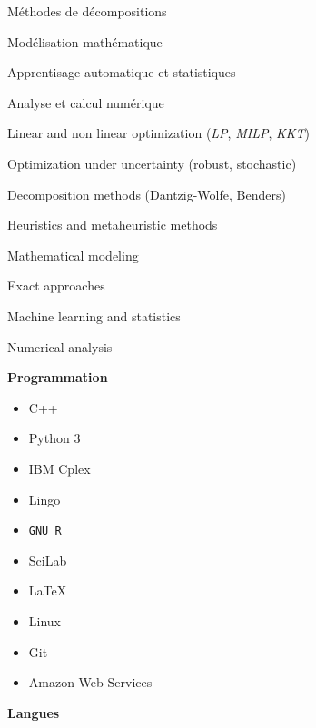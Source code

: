 \documentclass[11.5pt]{article}
\newcommand\en[1]{#1}
\begin{document}
\begin{minipage}[t]{\textwidth}
\begin{minipage}[t]{\cvRightWidth}
\begin{itemize}
{                        \item Méthodes de décompositions
                        \item Modélisation mathématique
                        \item Apprentisage automatique et statistiques
                        \item Analyse et calcul numérique
                    }
                    \en{
                        \item Linear and non linear optimization {\small (\emph{LP}, \emph{MILP}, \emph{KKT})}
                        \item Optimization under uncertainty (robust, stochastic)
                        \item Decomposition methods (Dantzig-Wolfe, Benders)
                        \item Heuristics and metaheuristic methods
                        \item Mathematical modeling
                        \item Exact approaches
                        \item Machine learning and statistics
                        \item Numerical analysis
                    }
                \end{itemize}
                \vspace{10pt}
            \textbf{Programmation}
            \begin{multicols}{2}
                \begin{itemize}
                    \item C++
                    \item Python 3
                    \item IBM Cplex
                    \item Lingo
                    \item\texttt{GNU R}
                    \item SciLab
                    \item\LaTeX
                    \item Linux
                    \item Git
                    \item Amazon Web Services
                \end{itemize}
            \end{multicols}
            \textbf{Langues}
            \begin{multicols}{2}

\end{multicols}
\end{minipage}
\end{minipage}
\end{document}
